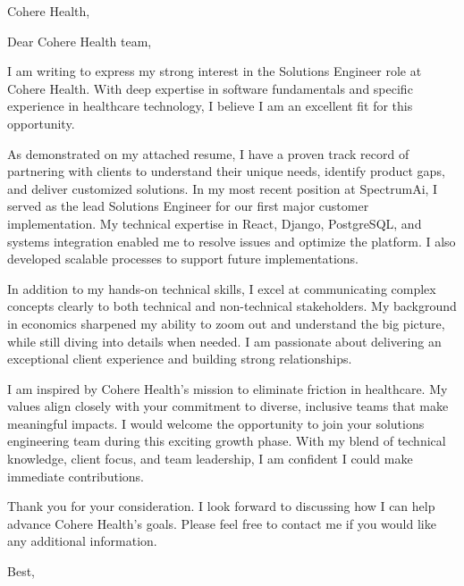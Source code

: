 \documentclass[a4paper, 10pt]{letter}
\begin{document}
	\begin{letter}
	{
	    Cohere Health,\\
	}

		    \opening{Dear Cohere Health team,}

			I am writing to express my strong interest in the Solutions Engineer role at Cohere Health. With deep expertise in software fundamentals and specific experience in healthcare technology, I believe I am an excellent fit for this opportunity.

			As demonstrated on my attached resume, I have a proven track record of partnering with clients to understand their unique needs, identify product gaps, and deliver customized solutions. In my most recent position at SpectrumAi, I served as the lead Solutions Engineer for our first major customer implementation. My technical expertise in React, Django, PostgreSQL, and systems integration enabled me to resolve issues and optimize the platform. I also developed scalable processes to support future implementations.

			In addition to my hands-on technical skills, I excel at communicating complex concepts clearly to both technical and non-technical stakeholders. My background in economics sharpened my ability to zoom out and understand the big picture, while still diving into details when needed. I am passionate about delivering an exceptional client experience and building strong relationships.

			I am inspired by Cohere Health's mission to eliminate friction in healthcare. My values align closely with your commitment to diverse, inclusive teams that make meaningful impacts. I would welcome the opportunity to join your solutions engineering team during this exciting growth phase. With my blend of technical knowledge, client focus, and team leadership, I am confident I could make immediate contributions.

			Thank you for your consideration. I look forward to discussing how I can help advance Cohere Health's goals. Please feel free to contact me if you would like any additional information.	
		    \closing{Best,}
		    \end{letter}
		    
\end{document}
